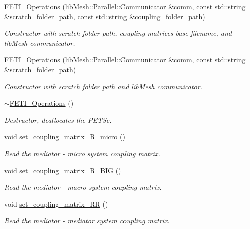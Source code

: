 \begin{DoxyCompactItemize}
\item 
\hyperlink{classcarl_1_1_f_e_t_i___operations_a95f7672533b2b9236d20ca4cdf8e2470}{F\+E\+T\+I\+\_\+\+Operations} (lib\+Mesh\+::\+Parallel\+::\+Communicator \&comm, const std\+::string \&scratch\+\_\+folder\+\_\+path, const std\+::string \&coupling\+\_\+folder\+\_\+path)
\begin{DoxyCompactList}\small\item\em Constructor with scratch folder path, coupling matrices base filename, and lib\+Mesh communicator. \end{DoxyCompactList}\item 
\hyperlink{classcarl_1_1_f_e_t_i___operations_adc1312e3037265129397decf7feb1bee}{F\+E\+T\+I\+\_\+\+Operations} (lib\+Mesh\+::\+Parallel\+::\+Communicator \&comm, const std\+::string \&scratch\+\_\+folder\+\_\+path)
\begin{DoxyCompactList}\small\item\em Constructor with scratch folder path and lib\+Mesh communicator. \end{DoxyCompactList}\item 
\hyperlink{classcarl_1_1_f_e_t_i___operations_a1650a30ed7f6105d0bd2bfc9db223fdc}{$\sim$\+F\+E\+T\+I\+\_\+\+Operations} ()
\begin{DoxyCompactList}\small\item\em Destructor, deallocates the P\+E\+T\+Sc. \end{DoxyCompactList}\item 
void \hyperlink{classcarl_1_1_f_e_t_i___operations_adf235fed677b91418b87f2c95dd7de70}{set\+\_\+coupling\+\_\+matrix\+\_\+\+R\+\_\+micro} ()
\begin{DoxyCompactList}\small\item\em Read the mediator -\/ micro system coupling matrix. \end{DoxyCompactList}\item 
void \hyperlink{classcarl_1_1_f_e_t_i___operations_a4f5445815dc2ef7b8182dcccc05463a2}{set\+\_\+coupling\+\_\+matrix\+\_\+\+R\+\_\+\+B\+I\+G} ()
\begin{DoxyCompactList}\small\item\em Read the mediator -\/ macro system coupling matrix. \end{DoxyCompactList}\item 
void \hyperlink{classcarl_1_1_f_e_t_i___operations_a72b5f4f66222ffefa79239ef70922f0c}{set\+\_\+coupling\+\_\+matrix\+\_\+\+R\+R} ()
\begin{DoxyCompactList}\small\item\em Read the mediator -\/ mediator system coupling matrix. \end{DoxyCompactList}\item 

\end{DoxyCompactItemize}
